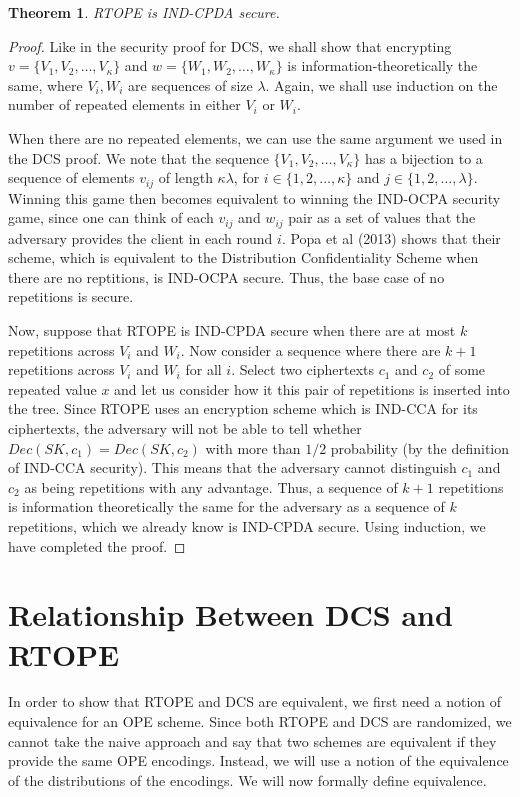 \documentclass[12pt]{article}
\newtheorem{theorem}{Theorem}[section]
\begin{document}
  \begin{theorem}
    RTOPE is IND-CPDA secure.
  \end{theorem}
  \begin{proof}
    Like in the security proof for DCS, we shall show that encrypting $v = \{V_1, V_2, \ldots, V_{\kappa} \}$ and $w = \{W_1, W_2, \ldots, W_{\kappa}\}$ is information-theoretically the same, where $V_i, W_i$ are sequences of size $\lambda$. Again, we shall use induction on the number of repeated elements in either $V_i$ or $W_i$. 

    When there are no repeated elements, we can use the same argument we used in the DCS proof. We note that the sequence $\{V_1, V_2, \ldots, V_{\kappa} \}$ has a bijection to a sequence of elements $v_{ij}$ of length $\kappa \lambda$, for $i \in \{1, 2, \ldots, \kappa\}$ and $j \in \{1, 2, \ldots, \lambda \}$. Winning this game then becomes equivalent to winning the IND-OCPA security game, since one can think of each $v_{ij}$ and $w_{ij}$ pair as a set of values that the adversary provides the client in each round $i$. Popa et al (2013) shows that their scheme, which is equivalent to the Distribution Confidentiality Scheme when there are no reptitions, is IND-OCPA secure. Thus, the base case of no repetitions is secure.

    Now, suppose that RTOPE is IND-CPDA secure when there are at most $k$ repetitions across $V_i$ and $W_i$. Now consider a sequence where there are $k+1$ repetitions across $V_i$ and $W_i$ for all $i$. Select two ciphertexts $c_1$ and $c_2$ of some repeated value $x$ and let us consider how it this pair of repetitions is inserted into the tree. Since RTOPE uses an encryption scheme which is IND-CCA for its ciphertexts, the adversary will not be able to tell whether $Dec(SK, c_1) = Dec(SK, c_2)$ with more than $1/2$ probability (by the definition of IND-CCA security). This means that the adversary cannot distinguish $c_1$ and $c_2$ as being repetitions with any advantage. Thus, a sequence of $k+1$ repetitions is information theoretically the same for the adversary as a sequence of $k$ repetitions, which we already know is IND-CPDA secure. Using induction, we have completed the proof.  
  \end{proof}

\section{Relationship Between DCS and RTOPE}

  In order to show that RTOPE and DCS are equivalent, we first need a notion of equivalence for an OPE scheme. Since both RTOPE and DCS are randomized, we cannot take the naive approach and say that two schemes are equivalent if they provide the same OPE encodings. Instead, we will use a notion of the equivalence of the distributions of the encodings. We will now formally define equivalence.
\end{document}
